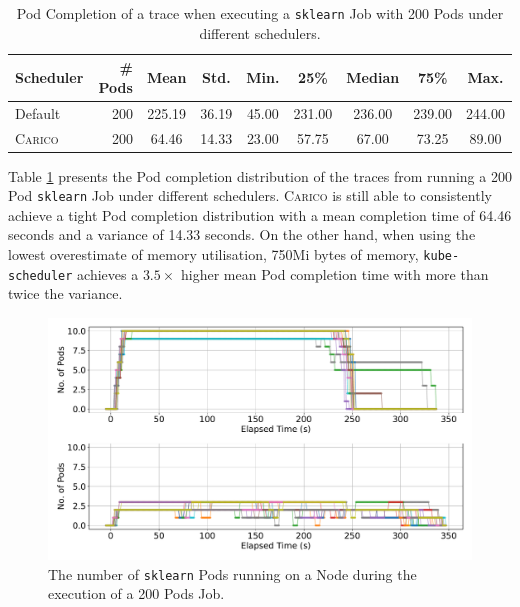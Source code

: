 \begin{table}[ht!]
\centering
    \begin{tabular}{|l|r|c|c|c|c|c|c|c|}
    \hline
        \bfseries Scheduler & \bfseries \# Pods & \bfseries Mean & \bfseries Std. &
        \bfseries Min. & \bfseries 25\% & \bfseries Median & \bfseries 75\% & \bfseries Max. \\
    \hline
        Default & 200 & 225.19 & 36.19 & 45.00 & 231.00 & 236.00 & 239.00 &
        244.00\\
        \textsc{Carico} & 200 & 64.46 & 14.33 & 23.00 & 57.75 & 67.00 & 73.25 & 89.00 \\
    \hline
    \end{tabular}
    \caption{Pod Completion of a trace when executing a \texttt{sklearn} Job
    with 200 Pods under different schedulers.}
    \label{tab:mem-pod-completions}
\end{table}

Table \ref{tab:mem-pod-completions} presents the Pod completion distribution of
the traces from running a 200 Pod \texttt{sklearn} Job under different
schedulers. \textsc{Carico} is still able to consistently achieve a tight Pod
completion distribution with a mean completion time of 64.46 seconds and a
variance of 14.33 seconds.  On the other hand, when using the lowest
overestimate of memory utilisation, 750Mi bytes of memory,
\texttt{kube-scheduler} achieves a $3.5 \times$ higher mean Pod completion time
with more than twice the variance.

\begin{figure}[ht!]
    \centering
    \includegraphics[width=\textwidth]{images/ml-running-pods.pdf}
    \caption{The number of \texttt{sklearn} Pods running on a Node during the
    execution of a 200 Pods Job.}
    \label{fig:ml-pod-running}
\end{figure}

